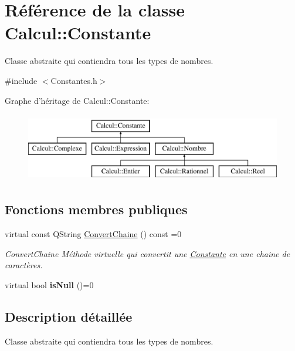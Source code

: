 \hypertarget{class_calcul_1_1_constante}{\section{Référence de la classe Calcul\-:\-:Constante}
\label{class_calcul_1_1_constante}
}


Classe abstraite qui contiendra tous les types de nombres.  




{\ttfamily \#include $<$Constantes.\-h$>$}

Graphe d'héritage de Calcul\-:\-:Constante\-:\begin{figure}[H]
\begin{center}
\leavevmode
\includegraphics[height=3.000000cm]{class_calcul_1_1_constante}
\end{center}
\end{figure}
\subsection*{Fonctions membres publiques}
\begin{DoxyCompactItemize}
\item 
virtual const Q\-String \hyperlink{class_calcul_1_1_constante_a80fb461841b16e6d5d1339802b69858e}{Convert\-Chaine} () const =0
\begin{DoxyCompactList}\small\item\em Convert\-Chaine Méthode virtuelle qui convertit une \hyperlink{class_calcul_1_1_constante}{Constante} en une chaine de caractères. \end{DoxyCompactList}\item 
\hypertarget{class_calcul_1_1_constante_a1e7ed8f7bd512111af953d77175d9e19}{virtual bool {\bfseries is\-Null} ()=0}\label{class_calcul_1_1_constante_a1e7ed8f7bd512111af953d77175d9e19}

\end{DoxyCompactItemize}


\subsection{Description détaillée}
Classe abstraite qui contiendra tous les types de nombres. 

